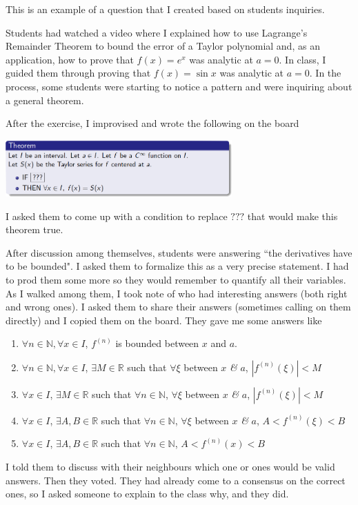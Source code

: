\documentclass[11pt]{article}
\newcommand {\DS} [1] {${\displaystyle #1}$}
\newcommand{\R}{\mathbb{R}}
\newcommand{\N}{\mathbb{N}}
\begin{document}
\begin{example}
This is an example of a question that I created based on students inquiries.
\begin{background}
Students had watched a video where I explained how to use Lagrange's Remainder Theorem to bound the error of a Taylor polynomial and, as an application, how to prove that \DS{f(x)=e^x} was analytic at $a=0$.  In class, I guided them through proving that \DS{f(x)=\sin x} was analytic at $a=0$.  In the process, some students were starting to notice a pattern and were inquiring about a general theorem. 
\end{background}
\vspace{-2mm}
\begin{question}
After the exercise, I improvised and wrote the following on the board
\begin{center}
	\includegraphics[width=0.65\textwidth]{EX5}
\end{center}
\vspace{-3mm}
I asked them to come up with a condition to replace $???$ that would make this theorem true. 
\end{question}
\vspace{-2mm}
\begin{comments}
After discussion among themselves, students were answering ``the derivatives have to be bounded".  I asked them to formalize this as a very precise statement.  I had to prod them some more so they would remember to quantify all their variables.  As I walked among them, I took note of who had interesting answers (both right and wrong ones).  I asked them to share their answers (sometimes calling on them directly) and I copied them on the board.  They gave me some answers like
	\begin{enumerate}
		\item  \DS{\forall n \in \N, \forall x \in I}, $f^{(n)}$ is bounded between $x$ and $a$.
		\item  \DS{\forall n \in \N, \forall x \in I}, $\exists M \in \R$ such that $\forall \xi$ between $x$ \emph{\&} $a$,  $| f^{(n)} (\xi)| < M$ 
		\item  \DS{ \forall x \in I}, $\exists M \in \R$ such that $\forall n \in \N$, $\forall \xi$ between $x$ \emph{\&} $a$,  $| f^{(n)} (\xi)| < M$ 
		\item  \DS{ \forall x \in I}, $\exists A, B \in \R$ such that $\forall n \in \N$, $\forall \xi$ between $x$ \emph{\&} $a$,  $A < f^{(n)} (\xi) < B$ 
		\item  \DS{ \forall x \in I}, $\exists A, B \in \R$ such that $\forall n \in \N$,  $A < f^{(n)} (x) < B$ 
	\end{enumerate}
I told them to discuss with their neighbours which one or ones would be valid answers.  Then they voted.  They had already come to a consensus on the correct ones, so I asked someone to explain to the class why, and they did.


\end{comments}
\end{example}
\end{document}
